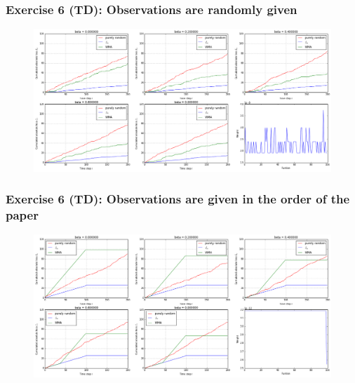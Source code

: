 \documentclass{beamer}
\begin{document}
\begin{frame}
	\frametitle{Exercise 6 (TD): Observations are randomly given }
	\begin{figure}
		\includegraphics[scale=0.25]{exo6.png}
	\end{figure}
\end{frame}
\begin{frame}
	\frametitle{Exercise 6 (TD): Observations are given in the order of the paper }
	\begin{figure}
		\includegraphics[scale=0.25]{exo6_ordered.png}
	\end{figure}
\end{frame}

\end{document}
